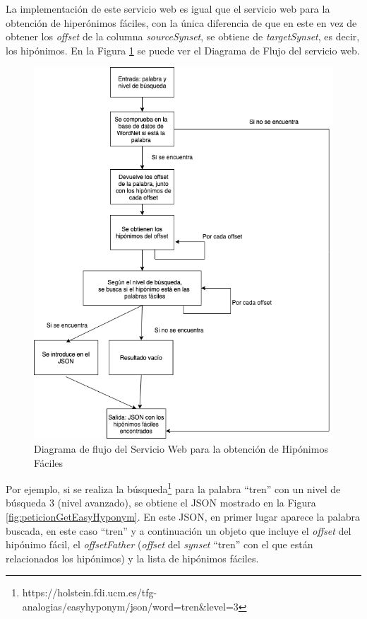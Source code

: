 La implementación de este servicio web es igual que el servicio web para la obtención de hiperónimos fáciles, con la única diferencia de que en este en vez de obtener los \textit{offset} de la columna \textit{sourceSynset}, se obtiene de \textit{targetSynset}, es decir, los hipónimos.
En la Figura \ref{fig:swhiponimos} se puede ver el Diagrama de Flujo del servicio web.
\begin{figure}[!h]
	\includegraphics[width=.9\textwidth]{Imagenes/Bitmap/Capitulo4/ServiciosWeb/DiagramaFlujoHiponimos.png}
	\centering
	\caption{Diagrama de flujo del Servicio Web para la obtención de Hipónimos Fáciles}
	\label{fig:swhiponimos}
\end{figure}



Por ejemplo, si se realiza la búsqueda\footnote{https://holstein.fdi.ucm.es/tfg-analogias/easyhyponym/json/word=tren\&level=3} para la palabra ``tren'' con un nivel de búsqueda 3 (nivel avanzado), se obtiene el JSON mostrado en la Figura \ref{fig:peticionGetEasyHyponym}.
En este JSON, en primer lugar aparece la palabra buscada, en este caso ``tren'' y a continuación un objeto que incluye el \textit{offset} del hipónimo fácil, el \textit{offsetFather} (\textit{offset} del \textit{synset} ``tren'' con el que están relacionados los hipónimos) y la lista de hipónimos fáciles.


